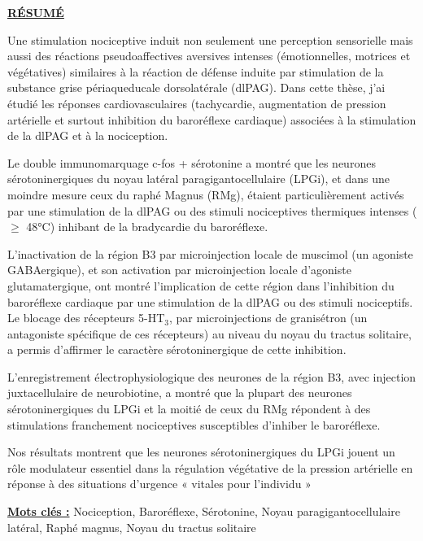 \documentclass[a4paper,12pt,twoside]{report}
\begin{document}
\begin{center}
\underline{\textbf{RÉSUMÉ}}
\end{center}
\begin{small}
Une stimulation nociceptive induit non seulement une perception sensorielle mais aussi des réactions pseudoaffectives aversives intenses (émotionnelles, motrices et végétatives) similaires à la réaction de défense induite par stimulation de la substance grise périaqueducale dorsolatérale (dlPAG). Dans cette thèse, j'ai étudié les réponses cardiovasculaires (tachycardie, augmentation de pression artérielle et surtout inhibition du baroréflexe cardiaque) associées à la stimulation de la dlPAG et à la nociception. 

Le double immunomarquage c-fos + sérotonine a montré que les neurones sérotoninergiques du noyau latéral paragigantocellulaire (LPGi), et dans une moindre mesure ceux du raphé Magnus (RMg), étaient particulièrement activés par une stimulation de la dlPAG ou des stimuli nociceptives thermiques intenses ($\ge$ 48°C) inhibant de la bradycardie du baroréflexe.

L’inactivation de la région B3 par microinjection locale de muscimol (un agoniste GABAergique), et son activation par microinjection locale d’agoniste glutamatergique, ont montré l'implication de cette région dans l’inhibition du baroréflexe cardiaque par une stimulation de la dlPAG ou des stimuli nociceptifs. Le blocage des récepteurs 5-HT$_{3}$, par microinjections de granisétron (un antagoniste spécifique de ces récepteurs) au niveau du noyau du tractus solitaire, a permis d'affirmer le caractère sérotoninergique de cette inhibition. 

L’enregistrement électrophysiologique des neurones de la région B3, avec injection juxtacellulaire de neurobiotine, a montré que la plupart des neurones sérotoninergiques du LPGi et la moitié de ceux du RMg répondent à des stimulations franchement nociceptives susceptibles d’inhiber le baroréflexe. 

Nos résultats montrent que les neurones sérotoninergiques du LPGi jouent un rôle modulateur essentiel dans la régulation végétative de la pression artérielle en réponse à des situations d'urgence « vitales pour l'individu »
\begin{center}
\textbf{\underline{Mots clés :}} Nociception, Baroréflexe, Sérotonine, Noyau paragigantocellulaire latéral, Raphé magnus, Noyau du tractus solitaire \end{center}
\end{small}
\end{document}

